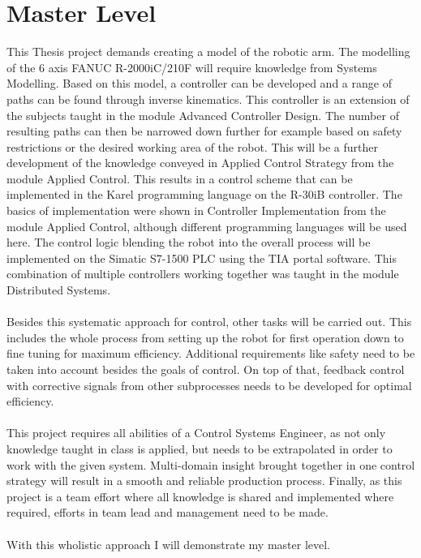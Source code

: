 
\chapter{Master Level}

This Thesis project demands creating a model of the robotic arm. The modelling of the 6 axis FANUC R-2000iC/210F will require knowledge from Systems Modelling. 
Based on this model, a controller can be developed and a range of paths can be found through inverse kinematics. This controller is an extension of the subjects taught in the module Advanced Controller Design. 
The number of resulting paths can then be narrowed down further for example based on safety restrictions or the desired working area of the robot. This will be a further development of the knowledge conveyed in Applied Control Strategy from the module Applied Control. 
This results in a control scheme that can be implemented in the Karel programming language on the R-30iB controller. The basics of implementation were shown in Controller Implementation from the module Applied Control, although different programming languages will be used here. 
The control logic blending the robot into the overall process will be implemented on the Simatic S7-1500 PLC using the TIA portal software. This combination of multiple controllers working together was taught in the module Distributed Systems.\\
\\
Besides this systematic approach for control, other tasks will be carried out. This includes the whole process from setting up the robot for first operation down to fine tuning for maximum efficiency. Additional requirements like safety need to be taken into account besides the goals of control. On top of that, feedback control with corrective signals from other subprocesses needs to be developed for optimal efficiency.\\
\\
This project requires all abilities of a Control Systems Engineer, as not only knowledge taught in class is applied, but needs to be extrapolated in order to work with the given system. Multi-domain insight brought together in one control strategy will result in a smooth and reliable production process. Finally, as this project is a team effort where all knowledge is shared and implemented where required, efforts in team lead and management need to be made.\\
\\
With this wholistic approach I will demonstrate my master level.
